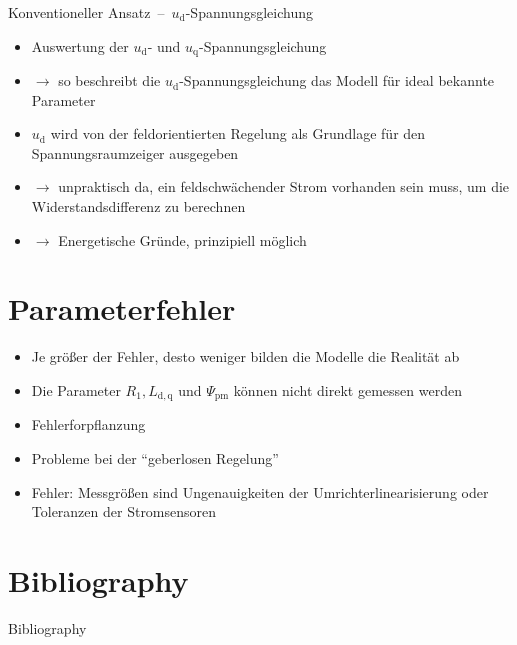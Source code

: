 \documentclass{beamer}
\newcommand{\x}[1]{\mathrm{#1}}
\begin{document}
\begin{frame}{Konventioneller Ansatz~--~$u_\x{d}$-Spannungsgleichung}
\begin{itemize}
	\item Auswertung der $u_\x{d}$- und $u_\x{q}$-Spannungsgleichung
	\item $\rightarrow$ so beschreibt die $u_\x{d}$-Spannungsgleichung das Modell für ideal bekannte Parameter
	\item $u_\x{d}$ wird von der feldorientierten Regelung als Grundlage für den Spannungsraumzeiger ausgegeben
\pause	\item $\rightarrow$ unpraktisch da, ein feldschwächender Strom vorhanden sein muss, um die Widerstandsdifferenz zu berechnen \autocite{Kellner2012}
\pause 	\item $\rightarrow$ Energetische Gründe, prinzipiell möglich
\end{itemize}
\end{frame}

\section{Parameterfehler}
\begin{frame}
\begin{itemize}
	\item Je größer der Fehler, desto weniger bilden die Modelle die Realität ab
	\item Die Parameter $R_\x{1}, L_\x{d,q}$ und $\Psi_\x{pm}$ können nicht direkt gemessen werden
	\item Fehlerforpflanzung
	\item Probleme bei der \enquote{geberlosen Regelung}
	\item Fehler: Messgrößen sind Ungenauigkeiten der Umrichterlinearisierung oder Toleranzen der Stromsensoren
\end{itemize}
\end{frame}

\section*{Bibliography}
\begin{frame}[allowframebreaks]{Bibliography}
\printbibliography
\end{frame}

\end{document}
